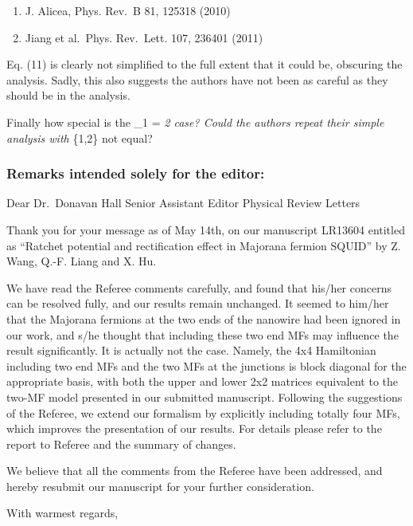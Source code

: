 \documentclass[11pt]{article}
\begin{document}
\begin{enumerate}
\def\labelenumi{\arabic{enumi})}
\item
  J. Alicea, Phys. Rev.~B 81, 125318 (2010)
\item
  Jiang et al.~Phys. Rev.~Lett. 107, 236401 (2011)
\end{enumerate}

Eq. (11) is clearly not simplified to the full extent that it could be,
obscuring the analysis. Sadly, this also suggests the authors have not
been as careful as they should be in the analysis.

Finally how special is the \delta\_1 = \delta\emph{2 case? Could the
authors repeat their simple analysis with \delta}\{1,2\} not equal?

\hypertarget{remarks-intended-solely-for-the-editor}{%
\subsubsection{Remarks intended solely for the
editor:}\label{remarks-intended-solely-for-the-editor}}

Dear Dr.~Donavan Hall Senior Assistant Editor Physical Review Letters

Thank you for your message as of May 14th, on our manuscript LR13604
entitled as ``Ratchet potential and rectification effect in Majorana
fermion SQUID'' by Z. Wang, Q.-F. Liang and X. Hu.

We have read the Referee comments carefully, and found that his/her
concerns can be resolved fully, and our results remain unchanged. It
seemed to him/her that the Majorana fermions at the two ends of the
nanowire had been ignored in our work, and s/he thought that including
these two end MFs may influence the result significantly. It is actually
not the case. Namely, the 4x4 Hamiltonian including two end MFs and the
two MFs at the junctions is block diagonal for the appropriate basis,
with both the upper and lower 2x2 matrices equivalent to the two-MF
model presented in our submitted manuscript. Following the suggestions
of the Referee, we extend our formalism by explicitly including totally
four MFs, which improves the presentation of our results. For details
please refer to the report to Referee and the summary of changes.

We believe that all the comments from the Referee have been addressed,
and hereby resubmit our manuscript for your further consideration.

With warmest regards,
\end{document}
